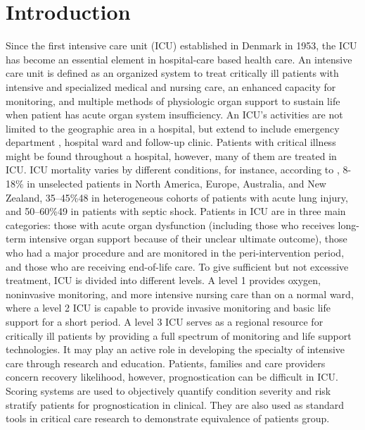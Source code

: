 \documentclass[12pt,a4paper,english
]{tunithesis}
\begin{document}
\chapter{Introduction}
\label{ch:intro} 

\setcounter{page}{1} %
                     


Since the first intensive care unit (ICU) established in Denmark in 1953, the ICU has become an essential element in hospital-care based health care. An intensive care unit is defined as an organized system to treat critically ill patients with intensive and specialized medical and nursing care, an enhanced capacity for monitoring, and multiple methods of physiologic organ support to sustain life when patient has acute organ system insufficiency. An ICU's activities are not limited to the geographic area in a hospital, but extend to include emergency department , hospital ward and follow-up clinic. \parencite{Marshell2017} Patients with critical illness might be found throughout a hospital, however, many of them are treated in ICU. ICU mortality varies by different conditions, for instance, according to \textcite{Adhikari2010}, 8-18\% in unselected patients in North America, Europe, Australia, and New Zealand, 35–45\%48 in heterogeneous cohorts of patients with acute lung injury, and 50–60\%49 in patients with septic shock. Patients in ICU are in three main categories: those with acute organ dysfunction (including those who receives long-term intensive organ support because of their unclear ultimate outcome), those who had a major procedure and are monitored in the peri-intervention period, and those who are receiving end-of-life care. To give sufficient but not excessive treatment, ICU is divided into different levels. A level 1 provides oxygen, noninvasive monitoring, and more intensive nursing care than on a normal ward, where a level 2 ICU is capable to provide invasive monitoring and basic life support for a short period. A level 3 ICU serves as a regional resource for critically ill patients by providing a full spectrum of monitoring and life support technologies. It may play an active role in developing the specialty of intensive care through research and education. \parencite{Marshell2017} Patients, families and care providers concern recovery likelihood, however, prognostication can be difficult in ICU. Scoring systems are used to objectively quantify condition severity and risk stratify patients for prognostication in clinical. They are also used as standard tools in critical care research to demonstrate equivalence of patients group. \parencite{Tiffany21}
\end{document}
